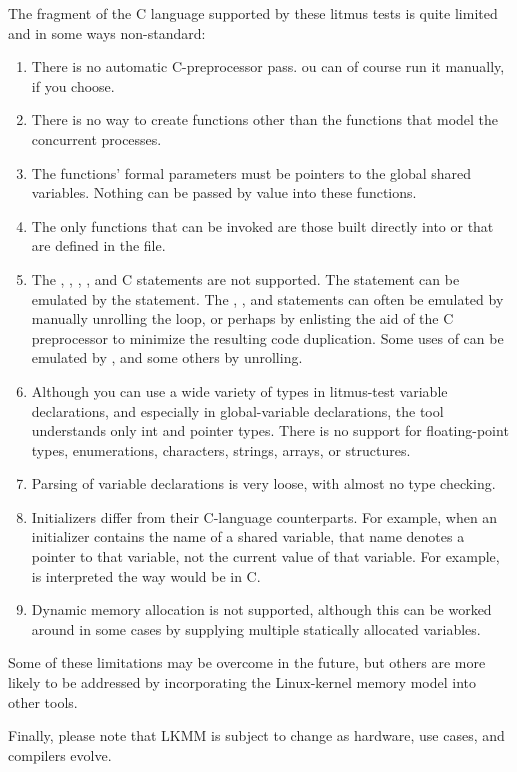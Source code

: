 The fragment of the C language supported by these litmus tests is quite
limited and in some ways non-standard:

\begin{enumerate}
\item	There is no automatic C-preprocessor pass.
	ou can of course run it manually, if you choose.

\item	There is no way to create functions other than the  functions
	that model the concurrent processes.

\item	The  functions' formal parameters must be pointers to the
	global shared variables.
	Nothing can be passed by value into these functions.

\item	The only functions that can be invoked are those built directly
	into  or that are defined in the  file.

\item	The , , , , and 
	C statements are not supported.
	The  statement can be emulated by the  statement.
	The , , and  statements can
	often be emulated by manually unrolling the loop, or perhaps by
	enlisting the aid of the C preprocessor to minimize the resulting
	code duplication.
	Some uses of  can be emulated by ,
	and some others by unrolling.

\item	Although you can use a wide variety of types in litmus-test
	variable declarations, and especially in global-variable
	declarations, the  tool understands only int and
	pointer types.
	There is no support for floating-point types, enumerations,
	characters, strings, arrays, or structures.

\item	Parsing of variable declarations is very loose, with almost no
	type checking.

\item	Initializers differ from their C-language counterparts.
	For example, when an initializer contains the name of a shared
	variable, that name denotes a pointer to that variable, not
	the current value of that variable.
	For example,  is interpreted the way 
	would be in C.

\item	Dynamic memory allocation is not supported, although this can
	be worked around in some cases by supplying multiple statically
	allocated variables.
\end{enumerate}

Some of these limitations may be overcome in the future, but others are
more likely to be addressed by incorporating the Linux-kernel memory model
into other tools.

Finally, please note that LKMM is subject to change as hardware, use cases,
and compilers evolve.
